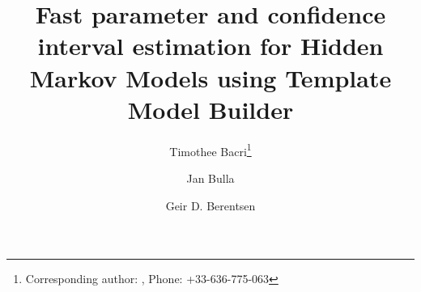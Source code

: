 \documentclass[bimj,fleqn]{w-art}\usepackage[]{graphicx}\usepackage[]{color}
\theoremstyle{plain}
\theoremstyle{definition}
\begin{document}
              








\title[Running title]{Fast parameter and confidence interval estimation for Hidden Markov Models using Template Model Builder}
\author[First Author{\it{et al.}}]{Timothee Bacri\footnote{Corresponding author: {}, Phone: +33-636-775-063}}
\address[\inst{1}]{Department of Statistics, University of Bergen, 5007 Bergen, Norway}
\author[dd]{Jan Bulla}
\author[]{Geir D. Berentsen}
\address[\inst{2}]{Department of Business and Management Science, Norwegian School of Economics, Helleveien 30, 5045 Bergen, Norway}
  
\end{document}
